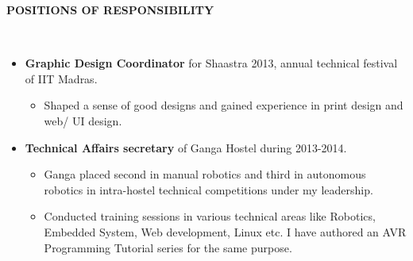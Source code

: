 \documentclass[a4paper,10pt]{article}
\newcommand{\lsep}{-0.5cm}
\newcommand{\resheading}[1]{{\small \colorbox{mygrey}{\begin{minipage}{0.975\textwidth}{\textbf{#1 \vphantom{p\^{E}}}}\end{minipage}}}}
\begin{document}
\resheading{\textbf{POSITIONS OF RESPONSIBILITY} }\\[\lsep]
    \begin{itemize}
        \item \textbf{Graphic Design Coordinator} for Shaastra 2013, annual technical festival of 
        IIT Madras.
        \vspace{-5pt}
        \begin{itemize}
            \item Shaped a sense of good designs and gained experience in print design and web/ UI design.
        \end{itemize}
        \vspace{-5pt}
        \item \textbf{Technical Affairs secretary} of Ganga Hostel during 2013-2014.
        \vspace{-5pt}
            \begin{itemize}
            \item  Ganga placed second in manual robotics and third in autonomous robotics in intra-hostel technical competitions under my leadership.
            \item Conducted training sessions in various technical areas like Robotics, Embedded System, Web development, Linux etc. I have authored an AVR Programming  Tutorial series for the same purpose.
            \end{itemize}
    \end{itemize}
\end{document}
